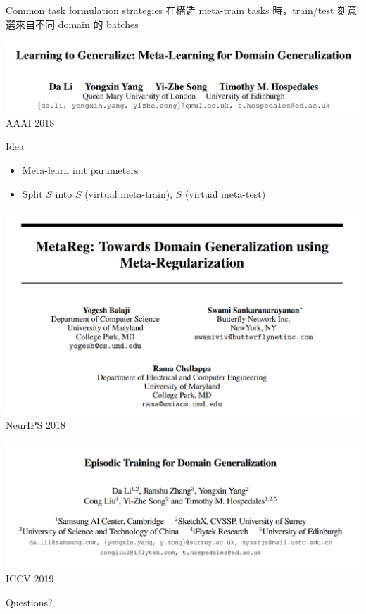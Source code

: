 \documentclass{beamer}
\begin{document}
\begin{frame}{Common task formulation strategies}
  在構造 meta-train tasks 時，train/test 刻意選來自不同 domain 的 batches
\end{frame}


\begin{frame}
  \includegraphics[width=\textwidth]{fig/MLDG-title.png}
  \center AAAI 2018
\end{frame}

\begin{frame}[t]{Idea}
  \begin{itemize}
    \item Meta-learn init parameters
    \item Split $S$ into $\bar{S}$ (virtual meta-train), $\breve{S}$ (virtual meta-test)
  \end{itemize}
\end{frame}

\begin{frame}
  \includegraphics[width=\textwidth]{fig/MetaReg.png}
  \center NeurIPS 2018
\end{frame}

\begin{frame}
  \includegraphics[width=\textwidth]{fig/EpiFCR-title.png}
  \center ICCV 2019
\end{frame}

\begin{frame}
	\begin{center}
    \LARGE{Questions?}
	\end{center}
\end{frame}
\end{document}
